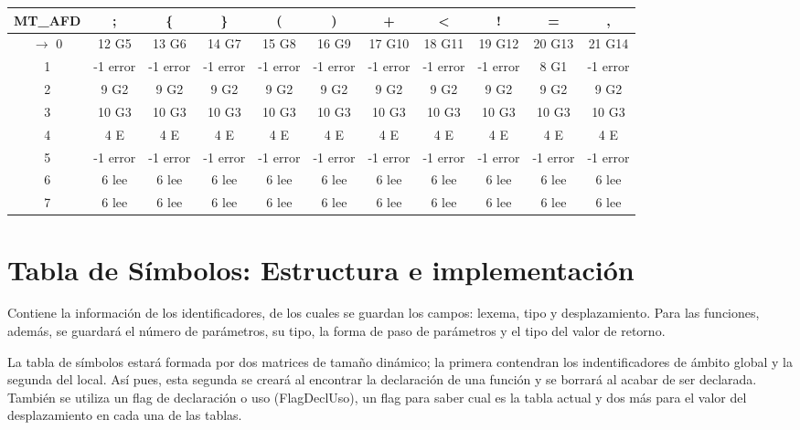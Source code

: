 \hspace*{-70pt} \begin{tabular}{|c|c|c|c|c|c|c|c|c|c|c|}
\hline
    \textbf{MT\_AFD}    & \textbf{;}  & \textbf{\{}     & \textbf{\}}     & \textbf{(}     & \textbf{)}     & \textbf{+}     & \textbf{\textless}     & \textbf{!}     & \textbf{=}     & \textbf{,} \\
\hline
$\rightarrow$ 0 & 12 G5 & 13 G6 & 14 G7 & 15 G8 & 16 G9 & 17 G10 & 18 G11 & 19 G12 & 20 G13 & 21 G14 \\
\hline
    1  & -1 error & -1 error & -1 error & -1 error & -1 error & -1 error & -1 error & -1 error & 8 G1  & -1 error \\
\hline
    2 & 9 G2 & 9 G2  & 9 G2  & 9 G2  & 9 G2  & 9 G2  & 9 G2  & 9 G2  & 9 G2  & 9 G2 \\
\hline
    3 & 10 G3 & 10 G3 & 10 G3 & 10 G3 & 10 G3 & 10 G3 & 10 G3 & 10 G3 & 10 G3 & 10 G3 \\
\hline
    4 & 4 E & 4 E   & 4 E   & 4 E   & 4 E   & 4 E   & 4 E   & 4 E   & 4 E   & 4 E \\
\hline
    5 & -1 error & -1 error & -1 error & -1 error & -1 error & -1 error & -1 error & -1 error & -1 error & -1 error \\
\hline
    6 & 6 lee & 6 lee & 6 lee & 6 lee & 6 lee & 6 lee & 6 lee & 6 lee & 6 lee & 6 lee \\
\hline
    7 & 6 lee & 6 lee & 6 lee & 6 lee & 6 lee & 6 lee & 6 lee & 6 lee & 6 lee & 6 lee \\
\hline
    \end{tabular}\hspace{-70pt}

    
\section{Tabla de Símbolos: Estructura e implementación}
Contiene la información de los identificadores, de los cuales se guardan los campos: lexema, tipo y desplazamiento.
Para las funciones, además, se guardará el número de parámetros, su tipo, la forma de paso de parámetros y el tipo del valor de retorno.

La tabla de símbolos estará formada por dos matrices de tamaño dinámico; la primera contendran los indentificadores de ámbito global y la segunda del local. Así pues, esta segunda se creará al encontrar la declaración de una función y se borrará al acabar de ser declarada. También se utiliza un flag de declaración o uso (FlagDeclUso), un flag para saber cual es la tabla actual y dos más para el valor del desplazamiento en cada una de las tablas.

